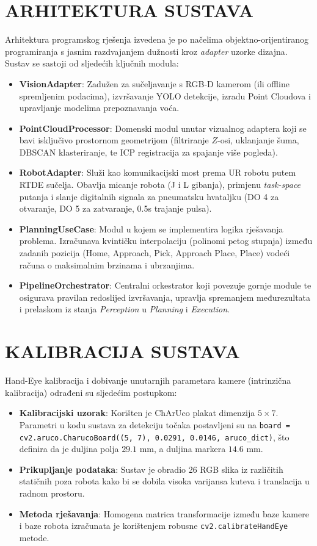 \documentclass[12pt,a4paper]{article}
\begin{document}
\section{ARHITEKTURA SUSTAVA}
Arhitektura programskog rješenja izvedena je po načelima objektno-orijentiranog programiranja s jasnim razdvajanjem dužnosti kroz \textit{adapter} uzorke dizajna. Sustav se sastoji od sljedećih ključnih modula:
\begin{itemize}
    \item \textbf{VisionAdapter}: Zadužen za sučeljavanje s RGB-D kamerom (ili offline spremljenim podacima), izvršavanje YOLO detekcije, izradu Point Cloudova i upravljanje modelima prepoznavanja voća.
    \item \textbf{PointCloudProcessor}: Domenski modul unutar vizualnog adaptera koji se bavi isključivo prostornom geometrijom (filtriranje $Z$-osi, uklanjanje šuma, DBSCAN klasteriranje, te ICP registracija za spajanje više pogleda).
    \item \textbf{RobotAdapter}: Služi kao komunikacijski most prema UR robotu putem RTDE sučelja. Obavlja micanje robota (J i L gibanja), primjenu \textit{task-space} putanja i slanje digitalnih signala za pneumatsku hvataljku (DO 4 za otvaranje, DO 5 za zatvaranje, 0.5s trajanje pulsa).
    \item \textbf{PlanningUseCase}: Modul u kojem se implementira logika rješavanja problema. Izračunava kvintičku interpolaciju (polinomi petog stupnja) između zadanih pozicija (Home, Approach, Pick, Approach Place, Place) vodeći računa o maksimalnim brzinama i ubrzanjima.
    \item \textbf{PipelineOrchestrator}: Centralni orkestrator koji povezuje gornje module te osigurava pravilan redoslijed izvršavanja, upravlja spremanjem međurezultata i prelaskom iz stanja \textit{Perception} u \textit{Planning} i \textit{Execution}.
\end{itemize}

\section{KALIBRACIJA SUSTAVA}
Hand-Eye kalibracija i dobivanje unutarnjih parametara kamere (intrinzična kalibracija) odrađeni su sljedećim postupkom:
\begin{itemize}
    \item \textbf{Kalibracijski uzorak}: Korišten je ChArUco plakat dimenzija $5 \times 7$. Parametri u kodu sustava za detekciju točaka postavljeni su na \texttt{board = cv2.aruco.CharucoBoard((5, 7), 0.0291, 0.0146, aruco\_dict)}, što definira da je duljina polja $29.1$ mm, a duljina markera $14.6$ mm.
    \item \textbf{Prikupljanje podataka}: Sustav je obradio 26 RGB slika iz različitih statičnih poza robota kako bi se dobila visoka varijansa kuteva i translacija u radnom prostoru.
    \item \textbf{Metoda rješavanja}: Homogena matrica transformacije između baze kamere i baze robota izračunata je korištenjem robusne \texttt{cv2.calibrateHandEye} metode.
\end{itemize}
\end{document}
